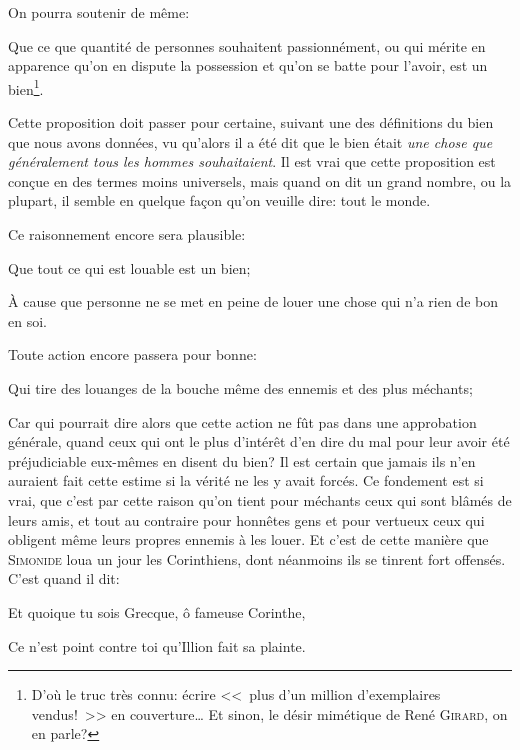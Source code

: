 \bigbreak

On pourra soutenir de même:

\begin{lieu}
	Que ce que quantité de personnes souhaitent passionnément, ou qui mérite en apparence qu'on en dispute la
	possession et qu'on se batte pour l'avoir, est un bien\footnote{D'où le truc très connu: écrire <<~plus d'un
	million d'exemplaires vendus!~>> en couverture\dots{} Et sinon, le désir mimétique de René \textsc{Girard}, on
	en parle?}.
\end{lieu}

Cette proposition doit passer pour certaine, suivant une des définitions du bien que nous avons données, vu qu'alors
il a été dit que le bien était \emph{une chose que généralement tous les hommes souhaitaient}. Il est vrai que cette
proposition est conçue en des termes moins universels, mais quand on dit un grand nombre, ou la plupart, il semble en
quelque façon qu'on veuille dire: tout le monde.

\bigbreak

Ce raisonnement encore sera plausible:

\begin{lieu}
	Que tout ce qui est louable est un bien;
\end{lieu}

À cause que personne ne se met en peine de louer une chose qui n'a rien de bon en soi. 

\bigbreak

Toute action encore passera pour bonne:

\begin{lieu}
	Qui tire des louanges de la bouche même des ennemis et des plus méchants;
\end{lieu}

Car qui pourrait dire alors que cette action ne fût pas dans une approbation générale, quand ceux qui ont le plus d'intérêt
d'en dire du mal pour leur avoir été préjudiciable eux-mêmes en disent du bien? Il est certain que jamais ils n'en auraient
fait cette estime si la vérité ne les y avait forcés. Ce fondement est si vrai, que c'est par cette raison qu'on tient pour
méchants ceux qui sont blâmés de leurs amis, et tout au contraire pour honnêtes gens et pour vertueux ceux qui obligent même
leurs propres ennemis à les louer. Et c'est de cette manière que \textsc{Simonide} loua un jour les Corinthiens, dont néanmoins
ils se tinrent fort offensés. C'est quand il dit:

\begin{emphpar}
	Et quoique tu sois Grecque, ô fameuse Corinthe,
	
	Ce n'est point contre toi qu'Illion fait sa plainte.
\end{emphpar}

